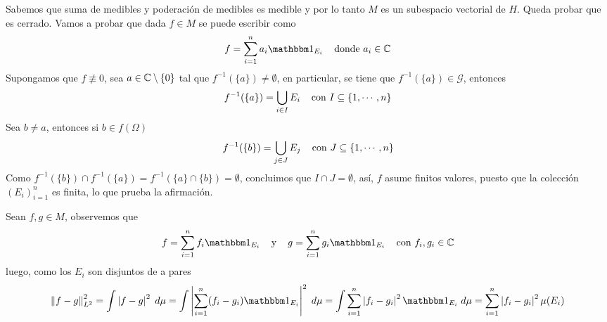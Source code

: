 \documentclass{article}
\begin{document}
\begin{enumerate}
    Sabemos que suma de medibles y poderación de medibles es medible y por lo tanto $M$ es un
    subespacio vectorial de $H$. Queda probar que es cerrado. Vamos a probar que dada $f\in M$ se 
    puede escribir como
    \begin{equation*}
        f=\sum_{i=1}^{n}a_{i}\I_{E_{i}}\hspace{4mm}\text{donde }a_{i}\in\C
    \end{equation*}
    Supongamos que $f\not\equiv0$, sea $a\in\mathbb{C}\setminus\{0\}$ tal que $f^{-1}(\{a\})
    \neq\emptyset$, en particular, se tiene que $f^{-1}(\{a\})\in\mathcal{G}$, entonces
    \begin{equation*}
        f^{-1}(\{a\})=\bigcup_{i\in I}E_{i}\hspace{4mm}\text{con }I\subseteq\{1,\cdots,n\}
    \end{equation*}
    Sea $b\neq a$, entonces si $b\in f(\Omega)$
    \begin{equation*}
        f^{-1}(\{b\})=\bigcup_{j\in J}E_{j}\hspace{4mm}\text{con }J\subseteq\{1,\cdots,n\}
    \end{equation*}
    Como $f^{-1}(\{b\})\cap f^{-1}(\{a\})=f^{-1}(\{a\}\cap\{b\})=\emptyset$, concluimos que 
    $I\cap J=\emptyset$, así, $f$ asume finitos valores, puesto que la colección 
    $(E_{i})_{i=1}^{n}$ es finita, lo que prueba la afirmación.

    Sean $f,g\in M$, observemos que
    \begin{equation*}
        f=\sum_{i=1}^{n}f_{i}\I_{E_{i}}\hspace{4mm}\text{y}\hspace{4mm}
        g=\sum_{i=1}^{n}g_{i}\I_{E_{i}}
        \hspace{4mm}\text{con }f_{i},g_{i}\in\C
    \end{equation*}
    luego, como los $E_{i}$ son disjuntos de a pares
    \begin{equation*}
        \norm{f-g}_{L^{2}}^{2}=\int \abs{f-g}^{2}\hspace{1mm}d\mu
        =\int\abs{\sum_{i=1}^{n}(f_{i}-g_{i})\I_{E_{i}}}^{2}\hspace{1mm}d\mu
        =\int\sum_{i=1}^{n}\abs{f_{i}-g_{i}}^{2}\I_{E_{i}}\hspace{1mm}d\mu
        =\sum_{i=1}^{n}\abs{f_{i}-g_{i}}^{2}\mu(E_{i})
    \end{equation*}


\end{enumerate}
\end{document}
